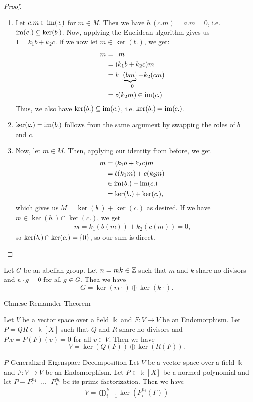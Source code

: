 \begin{proof}
	\begin{enumerate}
		\item Let $c.m \in \operatorname{im}(c.)$ for $m \in M$. Then we have $b.(c.m) = a.m = 0$, i.e. $\operatorname{im}(c.) \subseteq \ker(b.)$. Now, applying the Euclidean algorithm gives us $1 = k_1 b + k_2 c$. If we now let $m \in \ker(b.)$, we get:
		\begin{align*}
			m 
			&= 1m \\
			&= (k_1b + k_2c)m \\
			&= k_1\underbrace{(bm)}_{= 0} + k_2(cm) \\
			&= c(k_2m) \in \operatorname{im}(c.)
		\end{align*}
		Thus, we also have $\ker(b.) \subseteq \operatorname{im}(c.)$, i.e. $\ker(b.) = \operatorname{im}(c.)$.
		\item $\ker(c.) = \operatorname{im}(b.)$ follows from the same argument by swapping the roles of $b$ and $c$.
		\item Now, let $m \in M$. Then, applying our identity from before, we get
		\begin{align*}
			m &= (k_1b + k_2c)m\\
			&= b(k_1m) + c(k_2m)\\
			&\in \operatorname{im}(b.) + \operatorname{im}(c.)\\
			&= \ker(b.) + \ker(c.),
		\end{align*}
		which gives us $M = \ker(b.) + \ker(c.)$ as desired.
		\newpar
		If we have $m \in \ker(b.) \cap \ker(c.)$, we get
		\begin{align*}
			m = k_1(b(m)) + k_2(c(m)) = 0,
		\end{align*}
		so $\ker(b.) \cap \ker(c.) = \qty{0}$, so our sum is direct.
	\end{enumerate}	
\end{proof}
\begin{corollary}
	Let $G$ be an abelian group. Let $n = mk \in \mathbb{Z}$ such that $m$ and $k$ share no divisors and $n \cdot g = 0$ for all $g \in G$. Then we have
	$$G = \ker(m\cdot) \oplus \ker(k\cdot).$$
\end{corollary}
\begin{importantcorollary}{Chinese Remainder Theorem}{}
	
\end{importantcorollary}
\begin{corollary}
	Let $V$ be a vector space over a field $\Bbbk$ and $F : V \to V$ be an Endomorphism. Let $P = QR \in \Bbbk[X]$ such that $Q$ and $R$ share no divisors and $P.v = P(F)(v) = 0$ for all $v \in V$. Then we have
	$$V = \ker(Q(F)) \oplus \ker(R(F)).$$
\end{corollary}
\begin{importantcorollary}{$P$-Generalized Eigenspace Decomposition}{}
Let $V$ be a vector space over a field $\Bbbk$ and $F : V \to V$ be an Endomorphism. Let $P \in \Bbbk[X]$ be a normed polynomial and let $P = P_1^{n_1} \cdot \hdots \cdot P_k^{n_k}$ be its prime factorization. Then we have
\begin{align*}
	V = \bigoplus_{i = 1}^k \ker(P_i^{n_i}(F))
\end{align*}
\end{importantcorollary}
